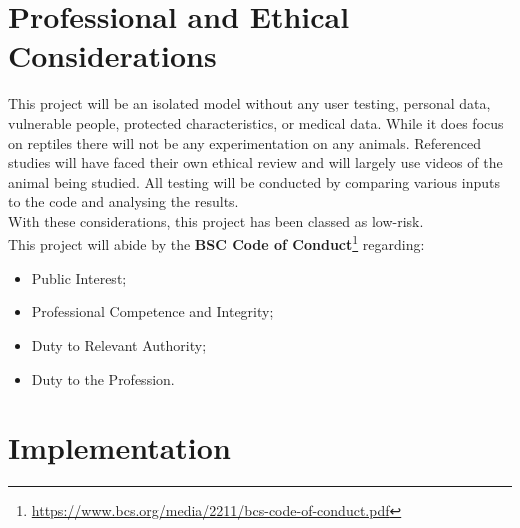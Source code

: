 \documentclass{article}
\begin{document}
\newpage
\section{Professional and Ethical Considerations}
This project will be an isolated model without any user testing, personal data, vulnerable people, protected characteristics, or medical data. While it does focus on reptiles there will not be any experimentation on any animals. Referenced studies will have faced their own ethical review and will largely use videos of the animal being studied. All testing will be conducted by comparing various inputs to the code and analysing the results.\\
With these considerations, this project has been classed as low-risk.\\

This project will abide by the \textbf{BSC Code of Conduct}\footnote{\url{https://www.bcs.org/media/2211/bcs-code-of-conduct.pdf}} regarding:
\begin{itemize}
 \item Public Interest;
 \item Professional Competence and Integrity;
 \item Duty to Relevant Authority;
 \item Duty to the Profession.
 \end{itemize}

\makeatletter
\renewcommand\footnoterule{\kern-3\p@\hrule\@width\ifodd\value{page}6in\else6in\fi\kern2.6\p@}
\makeatother 
    



\newpage
\section{Implementation}
\end{document}
